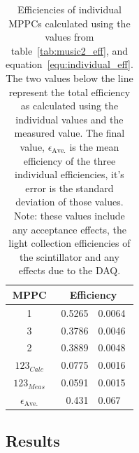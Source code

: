 \begin{table}
  \lineup
  \begin{center}
    \begin{tabular}{c|r@{~\(\pm\)~}l}
      MPPC  &  \multicolumn{2}{c}{Efficiency} \\
      \hline
      1  &  0.5265 & 0.0064  \\
      3  &  0.3786 & 0.0046  \\
      2  &  0.3889 & 0.0048  \\
      \hline
      \( 123_{Calc} \)  &  0.0775  &  0.0016  \\
      \( 123_{Meas} \)  &  0.0591  &  0.0015  \\
      \hline 
      \( \epsilon_{\text{Ave.}} \)  &  0.431\0 & 0.067 \\
         
    \end{tabular}
  \end{center}
  \caption{Efficiencies of individual MPPCs calculated using the values from table~\ref{tab:music2_eff}, and equation~\eqref{equ:individual_eff}. The two values below the line represent the total efficiency as calculated using the individual values and the measured value. The final value, \(\epsilon_{\text{Ave.}}\) is the mean efficiency of the three individual efficiencies, it's error is the standard deviation of those values. Note: these values include any acceptance effects, the light collection efficiencies of the scintillator and any effects due to the DAQ.}
  \label{tab:calculated_individual_eff}
\end{table}


\subsection{Results} %
\label{sec:results}

